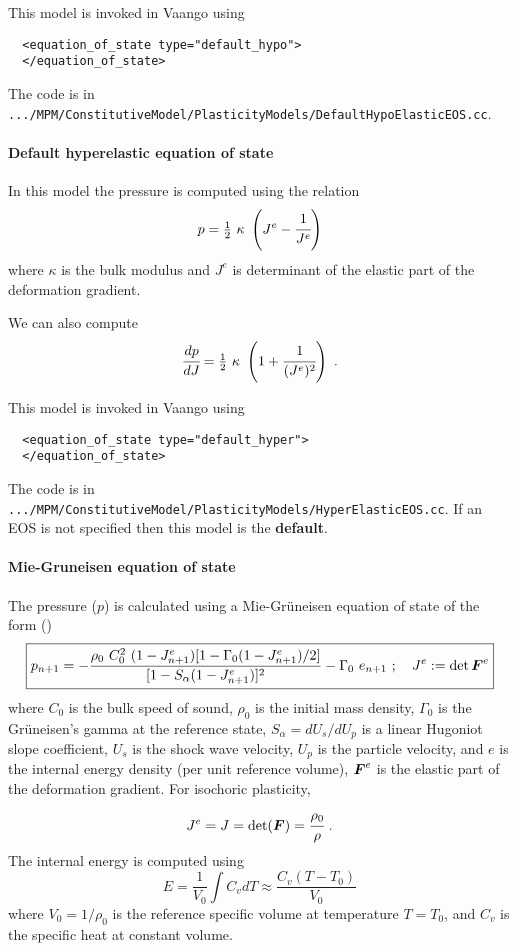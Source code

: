 This model is invoked in Vaango using
\lstset{language=XML}
\begin{lstlisting}
  <equation_of_state type="default_hypo">
  </equation_of_state>
\end{lstlisting}
The code is in \verb|.../MPM/ConstitutiveModel/PlasticityModels/DefaultHypoElasticEOS.cc|.

\paragraph{Default hyperelastic equation of state}
In this model the pressure is computed using the relation
\begin{equation}
  p = \tfrac{1}{2}~\kappa~\left(J^e - \cfrac{1}{J^e}\right)
\end{equation}
where $\kappa$ is the bulk modulus and $J^e$ is determinant of the elastic 
part of the deformation gradient.

We can also compute
\begin{equation}
  \cfrac{dp}{dJ} = \tfrac{1}{2}~\kappa~\left(1 + \cfrac{1}{(J^e)^2}\right) ~.
\end{equation}

This model is invoked in Vaango using
\lstset{language=XML}
\begin{lstlisting}
  <equation_of_state type="default_hyper">
  </equation_of_state>
\end{lstlisting}
The code is in \verb|.../MPM/ConstitutiveModel/PlasticityModels/HyperElasticEOS.cc|.  If an EOS is not specified then this model is the {\bf default}.

\paragraph{Mie-Gruneisen equation of state}
The pressure ($p$) is calculated using a Mie-Gr{\"u}neisen equation of state 
of the form (\cite{Wilkins1999,Zocher2000})
\begin{equation} \label{eq:EOSMG_upd}
  \boxed{
  p_{n+1} =  - \frac{\rho_0~C_0^2~(1 - J^e_{n+1})
           [1 - \Gamma_0 (1 - J^e_{n+1})/2]}
           {[1 - S_{\alpha}(1 - J^e_{n+1})]^2} - \Gamma_0~e_{n+1} 
  ~;~~~ J^e := \det{\ensuremath{\boldsymbol{F}}^e} 
  }
\end{equation}
where $C_0$ is the bulk speed of sound, $\rho_0$ is the initial mass density,
$\Gamma_0$ is the Gr{\"u}neisen's gamma at the reference state,
$S_{\alpha} = dU_s/dU_p$ is a linear Hugoniot slope coefficient,
$U_s$ is the shock wave velocity, $U_p$ is the particle velocity, and
$e$ is the internal energy density (per unit reference volume), $\boldsymbol{F}^e$ is
the elastic part of the deformation gradient.  For isochoric plasticity,
\begin{equation*}
  J^e = J = \det(\boldsymbol{F}) = \cfrac{\rho_0}{\rho} ~.
\end{equation*}
  The internal energy is computed using
  \begin{equation}
    E = \frac{1}{V_0} \int C_v dT \approx \frac{C_v (T-T_0)}{V_0}
  \end{equation}
  where $V_0 = 1/\rho_0$ is the reference specific volume at temperature 
  $T = T_0$, and $C_v$ is the specific heat at constant volume.

